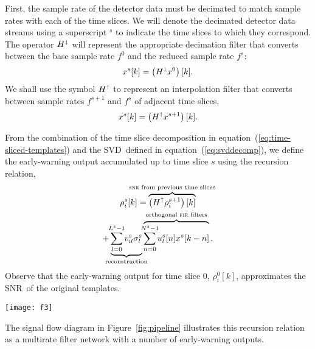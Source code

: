 \documentclass[preprint2]{aastex}
\newcommand{\SNR}{SNR}%
\newcommand{\SVD}{SVD}%
\newcommand{\fir}{FIR}%
\newcommand{\lloid}{LLOID}%
\def\clap#1{\hbox to 0pt{\hss#1\hss}}
\def\mathclap{\mathpalette\mathclapinternal}
\def\mathclapinternal#1#2{\clap{$\mathsurround=0pt#1{#2}$}}
\begin{document}
First, the sample rate of the detector data must be decimated to match sample
rates with each of the time slices.  We will denote the decimated detector data
streams using a superscript $^s$ to indicate the time slices to which they
correspond.  The operator $H^\shortdownarrow$ will represent the appropriate
decimation filter that converts between the base sample rate $f^0$ and the
reduced sample rate $f^s$:
\begin{equation*}
\label{eq:decomp}
	x^{s}[k] = \left( H^\shortdownarrow x^0\right)[k].
\end{equation*}
We shall use the symbol $H^\shortuparrow$ to represent an interpolation filter
that converts between sample rates $f^{s+1}$ and $f^s$ of adjacent time slices,
\begin{equation*}
	x^{s}[k] = \left( H^\shortuparrow x^{s+1}\right)[k].
\end{equation*}

From the combination of the time slice decomposition in
equation~(\ref{eq:time-sliced-templates}) and the \SVD\ defined in
equation~(\ref{eq:svddecomp}), we define the early-warning output accumulated
up to time slice $s$ using the recursion relation,
%
%
\begin{multline}
	\rho_i^s [k] =%
		\overbrace{
			\left(H^\uparrow \rho_i^{s+1}\right)[k]
		}^\textrm{\clap{{\sc snr} from previous time slices}} \\
		+
		\underbrace{
			\sum_{\mathclap{l=0}}^{\mathclap{L^s-1}} v_{il}^s \sigma_l^s
		}_\textrm{\clap{reconstruction}}
		\overbrace{
			\sum_{\mathclap{n=0}}^{\mathclap{N^s-1}} u_l^s[n] x^s[k-n]
		}^\textrm{\clap{orthogonal {\sc fir} filters}} .
\end{multline}
%
%
Observe that the early-warning output for time slice 0, $\rho_i^0[k]$,
approximates the \SNR\ of the original templates.
%
%
\begin{figure*}[h!]
	\begin{center}
		\texttt{[image: f3]}
		\caption{\label{fig:pipeline} Schematic of \lloid\ pipeline illustrating
signal flow.  Circles with arrows represent interpolation
\protect\texttt{[image: f3a]} or decimation
\protect\texttt{[image: f3b]}.  Circles with plus
signs represent summing junctions
\protect\texttt{[image: f3c]}.  Squares
\protect\texttt{[image: f3d]} stand for \fir\ filters.  Sample
rate decreases from the top of the diagram to the bottom.  In this diagram each
time slice contains three \fir\ filters that are linearly combined to produce
four output channels.  In a typical pipeline the number of \fir\ filters is
much less than the number of output channels.}
	\end{center}
\end{figure*}
%
%
The signal flow diagram in Figure~\ref{fig:pipeline} illustrates this
recursion relation as a multirate filter network with a number of early-warning outputs.
\end{document}
